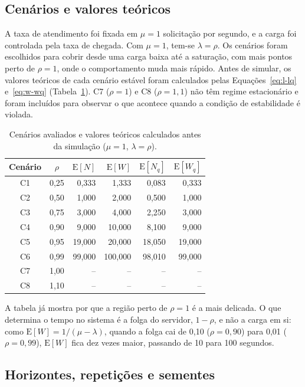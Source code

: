 \documentclass[
  article,      %
  10pt,         %
  oneside,
  a4paper,
  twocolumn,    %
  english,
  brazil        %
]{abntex2}
\newcommand{\EN}{\mathrm{E}[N]}
\newcommand{\EW}{\mathrm{E}[W]}
\newcommand{\ENq}{\mathrm{E}[N_q]}
\newcommand{\EWq}{\mathrm{E}[W_q]}
\begin{document}
\subsection{Cenários e valores teóricos}

A taxa de atendimento foi fixada em $\mu=1$ solicitação por segundo, e a carga foi controlada pela taxa de chegada. Com $\mu=1$, tem-se $\lambda=\rho$. Os cenários foram escolhidos para cobrir desde uma carga baixa até a saturação, com mais pontos perto de $\rho=1$, onde o comportamento muda mais rápido. Antes de simular, os valores teóricos de cada cenário estável foram calculados pelas Equações~\ref{eq:l-lq} e~\ref{eq:w-wq} (Tabela~\ref{tab:cenarios}). C7 ($\rho=1$) e C8 ($\rho=1{,}1$) não têm regime estacionário e foram incluídos para observar o que acontece quando a condição de estabilidade é violada.

\begin{table}[htbp]
  \centering
  \caption{Cenários avaliados e valores teóricos calculados antes da simulação ($\mu=1$, $\lambda=\rho$).}
  \label{tab:cenarios}
  \small
  \setlength{\tabcolsep}{4pt}
  \begin{tabular}{ccrrrr}
    \toprule
    Cenário & $\rho$ & $\EN$ & $\EW$ & $\ENq$ & $\EWq$ \\
    \midrule
    C1 & 0,25 & 0,333 & 1,333 & 0,083 & 0,333 \\
    C2 & 0,50 & 1,000 & 2,000 & 0,500 & 1,000 \\
    C3 & 0,75 & 3,000 & 4,000 & 2,250 & 3,000 \\
    C4 & 0,90 & 9,000 & 10,000 & 8,100 & 9,000 \\
    C5 & 0,95 & 19,000 & 20,000 & 18,050 & 19,000 \\
    C6 & 0,99 & 99,000 & 100,000 & 98,010 & 99,000 \\
    C7 & 1,00 & -- & -- & -- & -- \\
    C8 & 1,10 & -- & -- & -- & -- \\
    \bottomrule
  \end{tabular}
\end{table}

A tabela já mostra por que a região perto de $\rho=1$ é a mais delicada. O que determina o tempo no sistema é a folga do servidor, $1-\rho$, e não a carga em si: como $\EW=1/(\mu-\lambda)$, quando a folga cai de 0,10 ($\rho=0{,}90$) para 0,01 ($\rho=0{,}99$), $\EW$ fica dez vezes maior, passando de 10 para 100 segundos.

\subsection{Horizontes, repetições e sementes}
\end{document}
